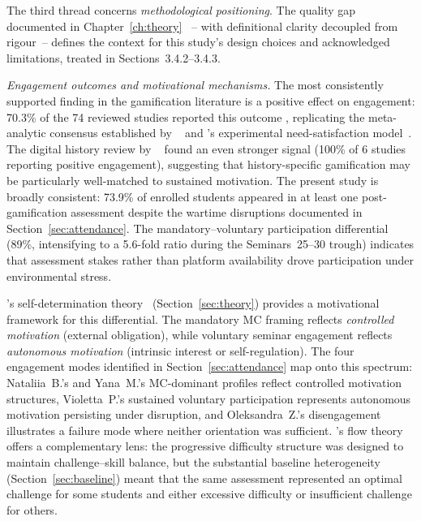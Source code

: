 The third thread concerns \emph{methodological positioning}. The quality gap documented in Chapter~\ref{ch:theory} \cite{Korniienko2025mrqs}~-- with definitional clarity decoupled from rigour~-- defines the context for this study's design choices and acknowledged limitations, treated in Sections~3.4.2--3.4.3.

\textit{Engagement outcomes and motivational mechanisms.} The most consistently supported finding in the gamification literature is a positive effect on engagement: 70.3\% of the 74 reviewed studies reported this outcome \cite{KorniienkoSemerikov2024}, replicating the meta-analytic consensus established by \citeauthor{Hamari2014}~\cite{Hamari2014} and \citeauthor{Sailer2017}'s experimental need-satisfaction model~\cite{Sailer2017}. The digital history review by \citeauthor{Korniienko2025cte}~\cite{Korniienko2025cte} found an even stronger signal (100\% of 6 studies reporting positive engagement), suggesting that history-specific gamification may be particularly well-matched to sustained motivation. The present study is broadly consistent: 73.9\% of enrolled students appeared in at least one post-gamification assessment despite the wartime disruptions documented in Section~\ref{sec:attendance}. The mandatory--voluntary participation differential (89\%, intensifying to a 5.6-fold ratio during the Seminars~25--30 trough) indicates that assessment stakes rather than platform availability drove participation under environmental stress.

\citeauthor{RyanDeci2000}'s self-determination theory~\cite{RyanDeci2000} (Section~\ref{sec:theory}) provides a motivational framework for this differential. The mandatory MC framing reflects \emph{controlled motivation} (external obligation), while voluntary seminar engagement reflects \emph{autonomous motivation} (intrinsic interest or self-regulation). The four engagement modes identified in Section~\ref{sec:attendance} map onto this spectrum: Nataliia~B.'s and Yana~M.'s MC-dominant profiles reflect controlled motivation structures, Violetta~P.'s sustained voluntary participation represents autonomous motivation persisting under disruption, and Oleksandra~Z.'s disengagement illustrates a failure mode where neither orientation was sufficient. \citeauthor{Csikszentmihalyi1990}'s flow theory~\cite{Csikszentmihalyi1990} offers a complementary lens: the progressive difficulty structure was designed to maintain challenge--skill balance, but the substantial baseline heterogeneity (Section~\ref{sec:baseline}) meant that the same assessment represented an optimal challenge for some students and either excessive difficulty or insufficient challenge for others.

